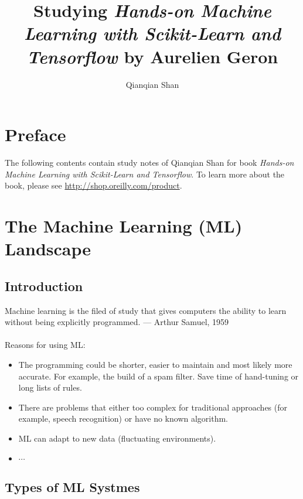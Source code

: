 \documentclass[12pt,oneside,a4paper]{article}
\author{Qianqian Shan}
\title{Studying \emph{Hands-on Machine Learning with Scikit-Learn and Tensorflow} by Aurelien Geron}
\date{\vspace{-5ex}}
\numberwithin{equation}{section}
\begin{document}
\maketitle
\tableofcontents

\section*{Preface}
The following contents contain study notes of Qianqian Shan for book \emph{Hands-on Machine Learning with Scikit-Learn and Tensorflow}. To learn more about the book, please see  \href{http://shop.oreilly.com/product/0636920052289.do}{http://shop.oreilly.com/product}. 
\section{The Machine Learning (ML) Landscape}

\subsection{Introduction}
Machine learning is the filed of study that gives computers the ability to learn without being explicitly programmed. --- Arthur Samuel, 1959\\~\\

Reasons for using ML: 
\begin{itemize}
\item The programming could be shorter, easier to maintain and most likely more accurate. For example, the build of a spam filter. Save time of hand-tuning or long lists of rules.
\item There are problems that either too complex for traditional approaches (for example, speech recognition) or have no known algorithm. 

\item ML can adapt to new data (fluctuating environments). 
\item $\cdots$
\end{itemize}
\subsection{Types of ML Systmes} 
\end{document}
